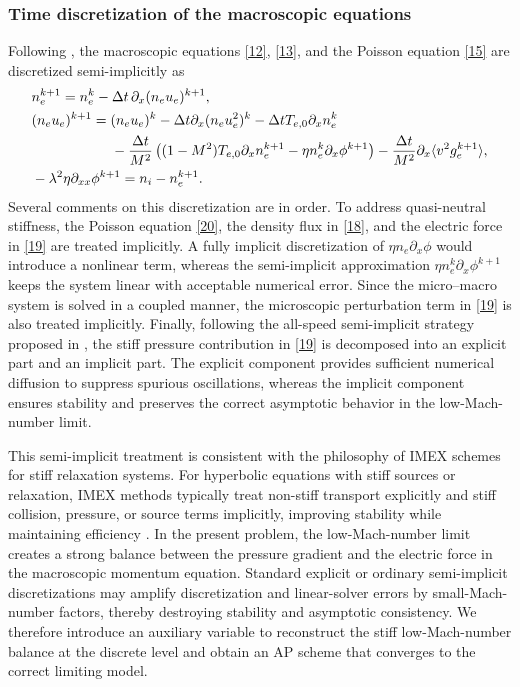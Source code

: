 \documentclass[pdflatex,final,10pt]{article}
\begin{document}
\subsubsection{Time discretization of the macroscopic equations}
Following \cite{yang2026multiscale}, the macroscopic equations \eqref{12}, \eqref{13}, and the Poisson equation \eqref{15} are discretized semi-implicitly as
\begin{align}
    &n_e^{k+1}=n_e^k-\Delta t\, \partial_x(n_e u_e)^{k+1},\label{18}\\
    &(n_e u_e)^{k+1}=(n_e u_e)^k-\Delta t \partial_x(n_e u_e^2)^k -\Delta t T_{e,0}\partial_xn_e^k\label{19}\\
    & \hspace{2cm}- \frac{\Delta t}{M^2}\left((1-M^2)T_{e,0}\partial_xn_e^{k+1}-\eta n_e^k\partial_x\phi^{k+1}\right) -\frac{\Delta t}{M^2}\partial_x\langle v^2g_e^{k+1} \rangle,\notag\\
    &-\lambda^2\eta\partial_{xx}\phi^{k+1}=n_i-n_e^{k+1}.\label{20}
\end{align}
Several comments on this discretization are in order. To address quasi-neutral stiffness, the Poisson equation \eqref{20}, the density flux in \eqref{18}, and the electric force in \eqref{19} are treated implicitly. A fully implicit discretization of $\eta n_e\partial_x\phi$ would introduce a nonlinear term, whereas the semi-implicit approximation $\eta n_e^k\partial_x\phi^{k+1}$ keeps the system linear with acceptable numerical error. Since the micro--macro system is solved in a coupled manner, the microscopic perturbation term in \eqref{19} is also treated implicitly. Finally, following the all-speed semi-implicit strategy proposed in \cite{degond2011all}, the stiff pressure contribution in \eqref{19} is decomposed into an explicit part and an implicit part. The explicit component provides sufficient numerical diffusion to suppress spurious oscillations, whereas the implicit component ensures stability and preserves the correct asymptotic behavior in the low-Mach-number limit.

This semi-implicit treatment is consistent with the philosophy of IMEX schemes for stiff relaxation systems. For hyperbolic equations with stiff sources or relaxation, IMEX methods typically treat non-stiff transport explicitly and stiff collision, pressure, or source terms implicitly, improving stability while maintaining efficiency \cite{jin1996numerical,pareschi2005implicit}. In the present problem, the low-Mach-number limit creates a strong balance between the pressure gradient and the electric force in the macroscopic momentum equation. Standard explicit or ordinary semi-implicit discretizations may amplify discretization and linear-solver errors by small-Mach-number factors, thereby destroying stability and asymptotic consistency. We therefore introduce an auxiliary variable to reconstruct the stiff low-Mach-number balance at the discrete level and obtain an AP scheme that converges to the correct limiting model.
\end{document}
